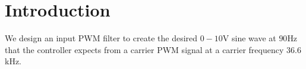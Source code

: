 \section{Introduction}
\label{sec:intro}

We design an input PWM filter to create the desired $0-10$\unit{\volt} sine wave
at $90$\unit{\hertz} that the controller expects from a carrier PWM signal at a
carrier frequency $36.6$\unit{\kilo\hertz}.
